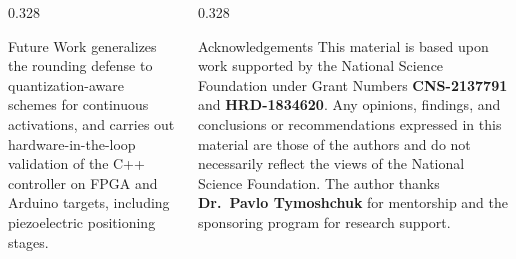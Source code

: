 \documentclass[final]{beamer}
\newlength{\rowCh}          \setlength{\rowCh}{11.1cm}
\begin{document}
\begin{frame}[t]
\begin{center}
\begin{minipage}{0.975\textwidth}
\begin{minipage}[t][\rowCh]{\linewidth}
\begin{columns}[T,totalwidth=\linewidth]
\begin{column}{0.328\linewidth}
\begin{posterpanel}[height=\rowCh]{Future Work}
							generalizes the rounding defense to quantization-aware schemes for
							continuous activations, and carries out hardware-in-the-loop
							validation of the C++ controller on FPGA and Arduino targets,
							including piezoelectric positioning stages.
						\end{posterpanel}
					\end{column}
					\begin{column}{0.328\linewidth}
						\begin{posterpanel}[height=\rowCh]{Acknowledgements}
							\centering
							This material is based upon work supported by the National Science
							Foundation under Grant Numbers \textbf{CNS-2137791} and
							\textbf{HRD-1834620}. Any opinions,
							findings, and conclusions or recommendations expressed in this material
							are those of the authors and do not necessarily reflect the views of the
							National Science Foundation. The author thanks
							\textbf{Dr.\ Pavlo Tymoshchuk} for mentorship and the sponsoring program
							for research support.
						\end{posterpanel}
					\end{column}
				\end{columns}
			\end{minipage}

		\end{minipage}
	\end{center}
\end{frame}
\end{document}
